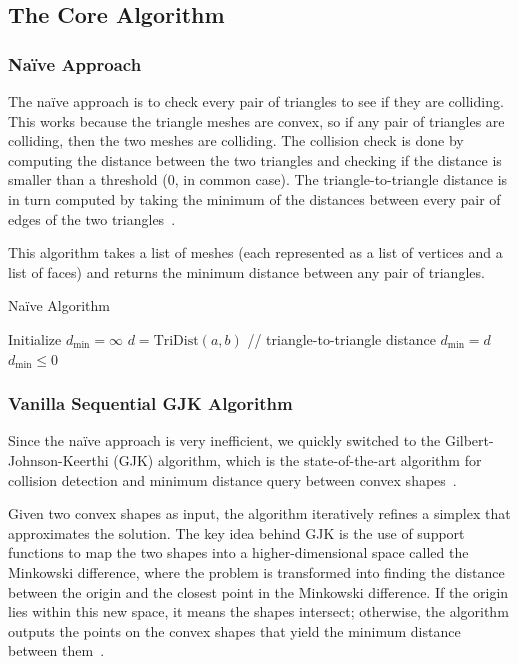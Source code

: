 \documentclass[12pt,fleqn]{article}
\begin{document}
\subsection{The Core Algorithm}

\subsubsection{Naïve Approach}
The naïve approach is to check every pair of triangles to see if they are colliding.
This works because the triangle meshes are convex, so if any pair of triangles are colliding, then the two meshes are colliding.
The collision check is done by computing the distance between the two triangles and checking if the distance is smaller than a threshold (0, in common case).
The triangle-to-triangle distance is in turn computed by taking the minimum of the distances between every pair of edges of the two triangles~\cite{larsen}.

This algorithm takes a list of meshes (each represented as a list of vertices and a list of faces) and returns the minimum distance between any pair of triangles.

\begin{algorithm}
    \caption{Naïve Algorithm}
    \begin{algorithmic}[1]
        \STATE Initialize $d_\text{min} = \infty$
                \STATE $d = \text{TriDist}(a, b)$ // triangle-to-triangle distance
                    \STATE $d_\text{min} = d$
                \ENDIF
            \ENDFOR
        \ENDFOR
        \RETURN $d_\text{min} \leq 0$
    \end{algorithmic}
\end{algorithm}

\subsubsection{Vanilla Sequential GJK Algorithm}
Since the naïve approach is very inefficient, we quickly switched to the Gilbert-Johnson-Keerthi (GJK) algorithm, which is the state-of-the-art algorithm for collision detection and minimum distance query between convex shapes~\cite{wikipedia_gjk}.

Given two convex shapes as input, the algorithm iteratively refines a simplex that approximates the solution.
The key idea behind GJK is the use of support functions to map the two shapes into a higher-dimensional space called the Minkowski difference, where the problem is transformed into finding the distance between the origin and the closest point in the Minkowski difference.
If the origin lies within this new space, it means the shapes intersect; otherwise, the algorithm outputs the points on the convex shapes that yield the minimum distance between them~\cite{cameron,serrano_2016}.
\end{document}
